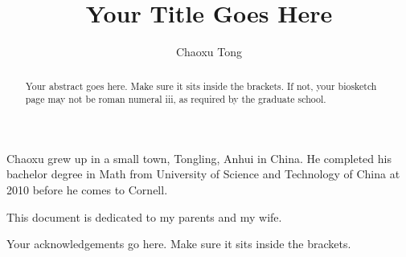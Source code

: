 \documentclass[phd,tocprelim]{cornell}
\title {Your Title Goes Here}
\author {Chaoxu Tong}
\begin{document}
\maketitle
\makecopyright

\begin{abstract}
Your abstract goes here. Make sure it sits inside the brackets. If not,
your biosketch page may not be roman numeral iii, as required by the
graduate school.
\end{abstract}

\begin{biosketch}
Chaoxu grew up in a small town, Tongling, Anhui in China.
He completed his bachelor degree in Math from University of Science and Technology of China
at 2010 before he comes to Cornell.
\end{biosketch}

\begin{dedication}
This document is dedicated to my parents and my wife.
\end{dedication}

\begin{acknowledgements}
Your acknowledgements go here. Make sure it sits inside the brackets.
\end{acknowledgements}

\contentspage
\tablelistpage
\figurelistpage

\normalspacing \setcounter{page}{1} 
\pagestyle{cornell} \addtolength{\parskip}{0.5\baselineskip}






\end{document}
